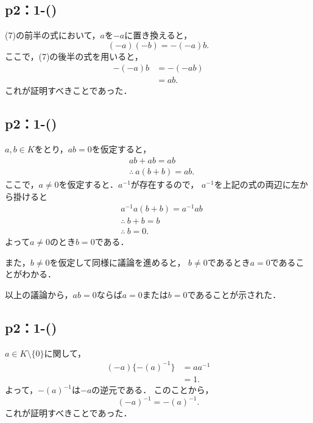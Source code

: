 \subsection*{p2：1-()}
\begin{tproof}
    (7)の前半の式において，$a$を$-a$に置き換えると，
    \[
        (-a)(-b) = -(-a)b.
    \]
    ここで，(7)の後半の式を用いると，
    \begin{align*}
        -(-a)b & = -(-ab) \\
               & = ab.
    \end{align*}
    これが証明すべきことであった．
\end{tproof}


\subsection*{p2：1-()}
\begin{tproof}
    $ a, b \in K$をとり，$ab =0$を仮定すると，
    \begin{align*}
         & ab + ab = ab            \\
         & \therefore ~ a(b+b)=ab.
    \end{align*}
    ここで，$a \ne 0$を仮定すると．$a^{-1}$が存在するので，
    $a^{-1}$を上記の式の両辺に左から掛けると
    \begin{align*}
         & a^{-1}a(b+b)=a^{-1}ab \\
         & \therefore ~ b+b=b    \\
         & \therefore ~ b=0.
    \end{align*}
    よって$a \ne 0$のとき$b=0$である．

    また，$b \ne 0$を仮定して同様に議論を進めると，
    $b \ne 0$であるとき$ a=0$であることがわかる．

    以上の議論から，$ab=0$ならば$a=0$または$b=0$であることが示された．
\end{tproof}

\subsection*{p2：1-()}
\begin{tproof}
    $ a \in K \setminus \{ 0 \} $に関して，
    \begin{align*}
        (-a) \{ -(a)^{-1} \} & = aa^{-1} \\
                             & =1.
    \end{align*}
    よって，$-(a)^{-1}$は$-a$の逆元である．
    このことから，
    \[
        (-a)^{-1} = -(a)^{-1}.
    \]
    これが証明すべきことであった．
\end{tproof}
